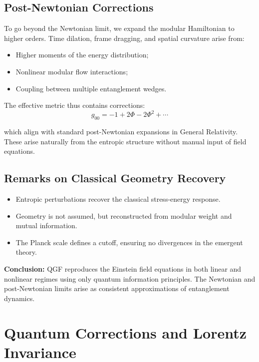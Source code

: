 \documentclass[11pt]{article}
\begin{document}
\subsection{Post-Newtonian Corrections}

To go beyond the Newtonian limit, we expand the modular Hamiltonian to higher orders. Time dilation, frame dragging, and spatial curvature arise from:
\begin{itemize}
    \item Higher moments of the energy distribution;
    \item Nonlinear modular flow interactions;
    \item Coupling between multiple entanglement wedges.
\end{itemize}

The effective metric thus contains corrections:
\begin{equation}
g_{00} = -1 + 2\Phi - 2\Phi^2 + \cdots
\end{equation}

which align with standard post-Newtonian expansions in General Relativity. These arise naturally from the entropic structure without manual input of field equations.

\subsection{Remarks on Classical Geometry Recovery}

\begin{itemize}
    \item Entropic perturbations recover the classical stress-energy response.
    \item Geometry is not assumed, but reconstructed from modular weight and mutual information.
    \item The Planck scale defines a cutoff, ensuring no divergences in the emergent theory.
\end{itemize}

\textbf{Conclusion:} QGF reproduces the Einstein field equations in both linear and nonlinear regimes using only quantum information principles. The Newtonian and post-Newtonian limits arise as consistent approximations of entanglement dynamics.



\section{Quantum Corrections and Lorentz Invariance}
\end{document}
